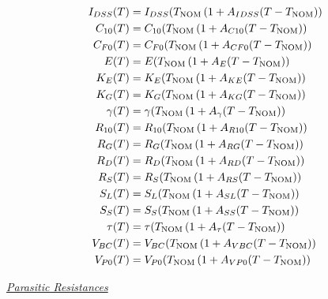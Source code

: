 \begin{align}
I_{DSS}(T) & =  I_{DSS}(T_{\mbox{\scriptsize NOM}}
                 \left( 1 + A_{IDSS}(T-T_{\mbox{\scriptsize NOM}} ) \right)\\
C_{10}(T)  & =  C_{10}(T_{\mbox{\scriptsize NOM}}
                 \left( 1 + A_{C10}(T-T_{\mbox{\scriptsize NOM}} ) \right)\\
C_{F0}(T)  & =  C_{F0}(T_{\mbox{\scriptsize NOM}}
                 \left( 1 + A_{CF0}(T-T_{\mbox{\scriptsize NOM}} ) \right)\\
E(T)       & =  E(T_{\mbox{\scriptsize NOM}}
                 \left( 1 + A_E(T-T_{\mbox{\scriptsize NOM}} ) \right)\\
K_E(T)     & =  K_E(T_{\mbox{\scriptsize NOM}}
                 \left( 1 + A_{KE}(T-T_{\mbox{\scriptsize NOM}} ) \right)\\
K_G(T)     & =  K_G(T_{\mbox{\scriptsize NOM}}
                 \left( 1 + A_{KG}(T-T_{\mbox{\scriptsize NOM}} ) \right)\\
\gamma (T) & =  \gamma(T_{\mbox{\scriptsize NOM}}
                 \left( 1 + A_{\gamma}(T-T_{\mbox{\scriptsize NOM}}) \right)\\
R_{10}(T)  & =  R_{10}(T_{\mbox{\scriptsize NOM}}
                 \left( 1 + A_{R10}(T-T_{\mbox{\scriptsize NOM}} ) \right)\\
R_G(T)     & =  R_G(T_{\mbox{\scriptsize NOM}}
                 \left( 1 + A_{RG}(T-T_{\mbox{\scriptsize NOM}} ) \right)\\
R_D(T)     & =  R_D(T_{\mbox{\scriptsize NOM}}
                 \left( 1 + A_{RD}(T-T_{\mbox{\scriptsize NOM}} ) \right)\\
R_S(T)     & =  R_S(T_{\mbox{\scriptsize NOM}}
                 \left( 1 + A_{RS}(T-T_{\mbox{\scriptsize NOM}} ) \right)\\
S_L(T)     & =  S_L(T_{\mbox{\scriptsize NOM}}
                 \left( 1 + A_{SL}(T-T_{\mbox{\scriptsize NOM}} ) \right)\\
S_S(T)     & =  S_S(T_{\mbox{\scriptsize NOM}}
                 \left( 1 + A_{SS}(T-T_{\mbox{\scriptsize NOM}} ) \right)\\
\tau(T)     & =  \tau(T_{\mbox{\scriptsize NOM}}
                 \left( 1 + A_{\tau}(T-T_{\mbox{\scriptsize NOM}} ) \right)\\
V_{BC}(T)  & =  V_{BC}(T_{\mbox{\scriptsize NOM}}
                 \left( 1 + A_{VBC}(T-T_{\mbox{\scriptsize NOM}} ) \right)\\
V_{P0}(T)  & =  V_{P0}(T_{\mbox{\scriptsize NOM}}
                 \left( 1 + A_{VP0}(T-T_{\mbox{\scriptsize NOM}} ) \right)
\end{align}


\noindent\underline{\sl \large Parasitic Resistances}\\[0.1in]

